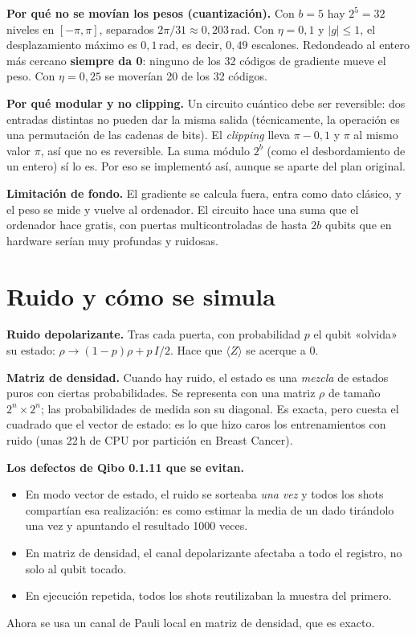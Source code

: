 \documentclass[11pt,a4paper]{article}
\begin{document}
\textbf{Por qué no se movían los pesos (cuantización).} Con $b=5$ hay $2^5 = 32$ niveles en $[-\pi,\pi]$, separados
$2\pi/31 \approx 0{,}203$\,rad. Con $\eta = 0{,}1$ y $|g| \le 1$, el desplazamiento máximo es $0{,}1$\,rad, es decir,
$0{,}49$ escalones. Redondeado al entero más cercano \textbf{siempre da 0}: ninguno de los 32 códigos de gradiente
mueve el peso. Con $\eta = 0{,}25$ se moverían 20 de los 32 códigos.

\textbf{Por qué modular y no clipping.} Un circuito cuántico debe ser reversible: dos entradas distintas no pueden dar la
misma salida (técnicamente, la operación es una permutación de las cadenas de bits). El \emph{clipping} lleva
$\pi - 0{,}1$ y $\pi$ al mismo valor $\pi$, así que no es reversible. La suma módulo $2^b$ (como el desbordamiento de un
entero) sí lo es. Por eso se implementó así, aunque se aparte del plan original.

\textbf{Limitación de fondo.} El gradiente se calcula fuera, entra como dato clásico, y el peso se mide y vuelve al
ordenador. El circuito hace una suma que el ordenador hace gratis, con puertas multicontroladas de hasta $2b$ qubits que
en hardware serían muy profundas y ruidosas.

\section{Ruido y cómo se simula}

\textbf{Ruido depolarizante.} Tras cada puerta, con probabilidad $p$ el qubit «olvida» su estado:
$\rho \to (1-p)\rho + p\,I/2$. Hace que $\langle Z\rangle$ se acerque a 0.

\textbf{Matriz de densidad.} Cuando hay ruido, el estado es una \emph{mezcla} de estados puros con ciertas
probabilidades. Se representa con una matriz $\rho$ de tamaño $2^n\times2^n$; las probabilidades de medida son su
diagonal. Es exacta, pero cuesta el cuadrado que el vector de estado: es lo que hizo caros los entrenamientos con ruido
(unas 22\,h de CPU por partición en Breast Cancer).

\textbf{Los defectos de Qibo 0.1.11 que se evitan.}
\begin{itemize}
  \item En modo vector de estado, el ruido se sorteaba \emph{una vez} y todos los shots compartían esa realización: es
        como estimar la media de un dado tirándolo una vez y apuntando el resultado 1000 veces.
  \item En matriz de densidad, el canal depolarizante afectaba a todo el registro, no solo al qubit tocado.
  \item En ejecución repetida, todos los shots reutilizaban la muestra del primero.
\end{itemize}
Ahora se usa un canal de Pauli local en matriz de densidad, que es exacto.
\end{document}
